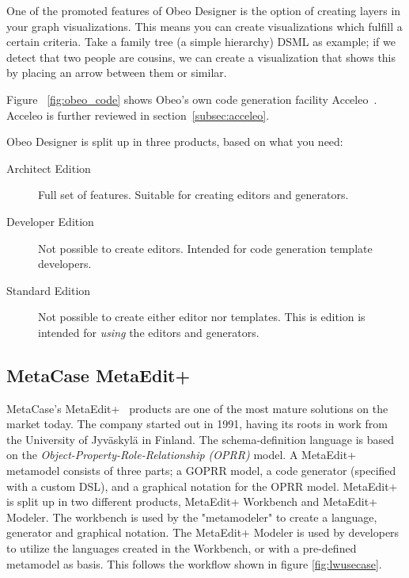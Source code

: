\newpage

One of the promoted features of Obeo Designer is the option of creating layers in your graph visualizations. This means you can create visualizations which fulfill a certain criteria. Take a family tree (a simple hierarchy) DSML as example; if we detect that two people are cousins, we can create a visualization that shows this by placing an arrow between them or similar.

Figure ~\ref{fig:obeo_code} shows Obeo's own code generation facility Acceleo~\cite{acceleo}. Acceleo is further reviewed in section~\ref{subsec:acceleo}.

Obeo Designer is split up in three products, based on what you need:
\begin{description}
  \item[Architect Edition] Full set of features. Suitable for creating editors and generators.
  \item[Developer Edition] Not possible to create editors. Intended for code generation template developers.
  \item[Standard Edition] Not possible to create either editor nor templates. This is edition is intended for \emph{using} the editors and generators.
\end{description}
% 
\subsection{MetaCase MetaEdit+}
MetaCase's MetaEdit+~\cite{metacase} products are one of the most mature solutions on the market today. The company started out in 1991, having its roots in work from the University of Jyväskylä in Finland. The schema-definition language is based on the \emph{Object-Property-Role-Relationship (OPRR)} model. A MetaEdit+ metamodel consists of three parts; a GOPRR model, a code generator (specified with a custom DSL), and a graphical notation for the OPRR model. MetaEdit+ is split up in two different products, MetaEdit+ Workbench and MetaEdit+ Modeler. The workbench is used by the "metamodeler" to create a language, generator and graphical notation. The MetaEdit+ Modeler is used by developers to utilize the languages created in the Workbench, or with a pre-defined metamodel as basis. This follows the workflow shown in figure \ref{fig:lwusecase}.

